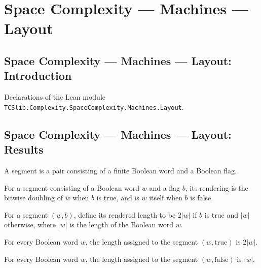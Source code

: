 \section{Space Complexity --- Machines --- Layout}
\subsection*{Space Complexity --- Machines --- Layout: Introduction}

Declarations of the Lean module \texttt{TCSlib.Complexity.SpaceComplexity.Machines.Layout}.

\subsection*{Space Complexity --- Machines --- Layout: Results}

\begin{definition}
\label{Complexity.LogProg.Seg}
\leanok
A segment is a pair consisting of a finite Boolean word and a Boolean flag.
\end{definition}

\begin{definition}
\label{Complexity.LogProg.render}
\leanok
{}
For a segment consisting of a Boolean word $w$ and a flag $b$, its rendering is the
bitwise doubling of $w$ when $b$ is true, and is $w$ itself when $b$ is false.
\end{definition}

\begin{definition}
\label{Complexity.LogProg.rlen}
\leanok
{}
For a segment $(w,b)$, define its rendered length to be $2|w|$ if $b$ is true and $|w|$
otherwise, where $|w|$ is the length of the Boolean word $w$.
\end{definition}

\begin{lemma}
\label{Complexity.LogProg.rlen_true}
\leanok
{}
For every Boolean word $w$, the length assigned to the segment $(w,\mathrm{true})$ is
$2|w|$.
\end{lemma}

\begin{lemma}
\label{Complexity.LogProg.rlen_false}
\leanok
{}
For every Boolean word $w$, the length assigned to the segment $(w,\mathrm{false})$ is
$|w|$.
\end{lemma}

